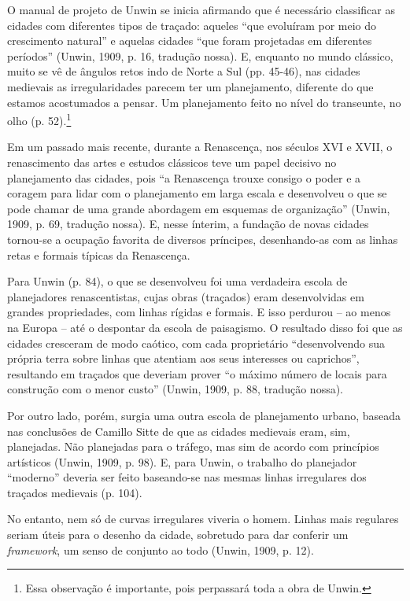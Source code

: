 \documentclass[12pt, a4paper]{book} %
\begin{document}
        O manual de projeto de Unwin se inicia afirmando que é necessário classificar as cidades com diferentes tipos de traçado: aqueles ``que evoluíram por meio do crescimento natural'' e aquelas cidades ``que foram projetadas em diferentes períodos'' (Unwin, 1909, p. 16, tradução nossa). E, enquanto no mundo clássico, muito se vê de ângulos retos indo de Norte a Sul (pp. 45-46), nas cidades medievais as irregularidades parecem ter um planejamento, diferente do que estamos acostumados a pensar. Um planejamento feito no nível do transeunte, no olho (p. 52).\footnote[2]{Essa observação é importante, pois perpassará toda a obra de Unwin.}

        Em um passado mais recente, durante a Renascença, nos séculos XVI e XVII, o renascimento das artes e estudos clássicos teve um papel decisivo no planejamento das cidades, pois ``a Renascença trouxe consigo o poder e a coragem para lidar com o planejamento em larga escala e desenvolveu o que se pode chamar de uma grande abordagem em esquemas de organização'' (Unwin, 1909, p. 69, tradução nossa). E, nesse ínterim, a fundação de novas cidades tornou-se a ocupação favorita de diversos príncipes, desenhando-as com as linhas retas e formais típicas da Renascença.

        Para Unwin (p. 84), o que se desenvolveu foi uma verdadeira escola de planejadores renascentistas, cujas obras (traçados) eram desenvolvidas em grandes propriedades, com linhas rígidas e formais. E isso perdurou – ao menos na Europa – até o despontar da escola de paisagismo. O resultado disso foi que as cidades cresceram de modo caótico, com cada proprietário ``desenvolvendo sua própria terra sobre linhas que atentiam aos seus interesses ou caprichos'', resultando em traçados que deveriam prover ``o máximo número de locais para construção com o menor custo'' (Unwin, 1909, p. 88, tradução nossa).

        Por outro lado, porém, surgia uma outra escola de planejamento urbano, baseada nas conclusões de Camillo Sitte de que as cidades medievais eram, sim, planejadas. Não planejadas para o tráfego, mas sim de acordo com princípios artísticos (Unwin, 1909, p. 98). E, para Unwin, o trabalho do planejador ``moderno'' deveria ser feito baseando-se nas mesmas linhas irregulares dos traçados medievais (p. 104).
        
        No entanto, nem só de curvas irregulares viveria o homem. Linhas mais regulares seriam úteis para o desenho da cidade, sobretudo para dar conferir um \textit{framework}, um senso de conjunto ao todo (Unwin, 1909, p. 12).
        
\end{document}
